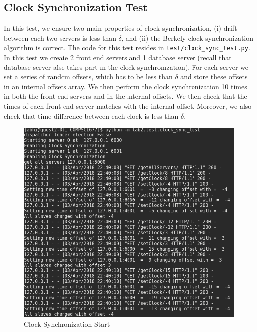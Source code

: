 \documentclass{article}
\begin{document}
\subsection{Clock Synchronization Test}
In this test, we ensure two main properties of clock synchronization, 
(i) drift between each two servers is less than $\delta$, and (ii) the 
Berkely clock synchronization algorithm is correct. The code for this test
resides in \texttt{test/clock\_sync\_test.py}. In this test we create 2 front
end servers and 1 database server (recall that database server also takes
part in the clock synchronization). For each server we set a series of random
offsets, which has to be less than $\delta$ and store these offsets 
in an internal offsets array. We then perform the clock synchronization
10 times in both the front end servers and in the internal offsets. 
We then check that the times of each front end server matches with the internal
offset. Moreover, we also check that time difference between each clock is
less than $\delta$.

\begin{figure}[H]
        \centering
        \includegraphics[width=\textwidth]{outputs/clock_sync_test_start.png}
        \caption{Clock Synchronization Start \label{fig:clonk_synchronization}}
\end{figure}
\end{document}
